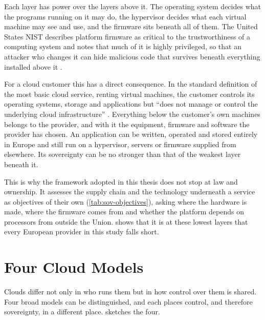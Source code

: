 Each layer has power over the layers above it. The operating system decides what
the programs running on it may do, the hypervisor decides what each virtual
machine may see and use, and the firmware sits beneath all of them. The United
States \ac{NIST} describes platform firmware as critical to the
trustworthiness of a computing system and notes that much of it is highly
privileged, so that an attacker who changes it can hide malicious code that
survives beneath everything installed above it \cite{NIST_SP800193_2018}.

For a cloud customer this has a direct consequence. In the standard definition of
the most basic cloud service, renting virtual machines, the customer controls its
operating systems, storage and applications but \enquote{does not manage or
control the underlying cloud infrastructure} \cite{NIST_SP800145_2011}. Everything
below the customer's own machines belongs to the provider, and with it the
equipment, firmware and software the provider has chosen. An application can be
written, operated and stored entirely in Europe and still run on a hypervisor,
servers or firmware supplied from elsewhere. Its sovereignty can be no stronger
than that of the weakest layer beneath it.

This is why the framework adopted in this thesis does not stop at law and
ownership. It assesses the supply chain and the technology underneath a service
as objectives of their own (\cref{tab:sov-objectives}), asking where the
hardware is made, where the firmware comes from and whether the platform depends
on processors from outside the Union.  shows that it
is at these lowest layers that every European provider in this study falls short.

\section{Four Cloud Models}
\label{sec:cloud-models}

Clouds differ not only in who runs them but in how control over them is shared.
Four broad models can be distinguished, and each places control, and therefore
sovereignty, in a different place.  sketches the four.


